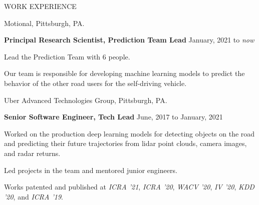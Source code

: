 \documentclass{resume} %
\begin{document}
\begin{rSection}{WORK EXPERIENCE}

\begin{rSubsection}{\hspace{-1em} Motional, Pittsburgh, PA.}{}{}{}
\item[] \hspace{-2em} {\bf Principal Research Scientist, Prediction Team Lead} \hfill January, 2021 to \emph{now}
\item Lead the Prediction Team with 6 people.
\item Our team is responsible for developing machine learning models to predict the behavior of the other road users for the self-driving vehicle.
\end{rSubsection}

\begin{rSubsection}{\hspace{-1em} Uber Advanced Technologies Group, Pittsburgh, PA.}{}{}{}
\item[] \hspace{-2em} {\bf Senior Software Engineer, Tech Lead} \hfill June, 2017 to January, 2021
\item Worked on the production deep learning models for detecting objects on the road and predicting their future trajectories from lidar point clouds, camera images, and radar returns.
\item Led projects in the team and mentored junior engineers.
\item Works patented and published at \emph{ICRA '21}, \emph{ICRA '20}, \emph{WACV '20}, \emph{IV '20}, \emph{KDD '20}, and \emph{ICRA '19}.
\end{rSubsection}
\end{rSection}
\end{document}
